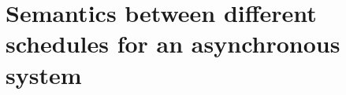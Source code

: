 \section{Semantics between different schedules for an asynchronous system}
\label{sec:semantics_schedules}



